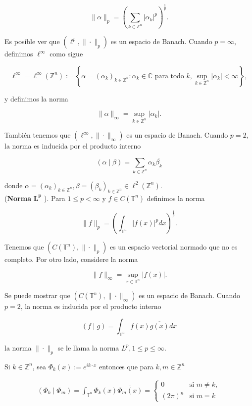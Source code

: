 \documentclass[12pt]{article}
\newcommand\Z{\ensuremath{\mathbb{Z}}}
\newcommand\T{\mathbb{T}}
\begin{document}
$$
\|\alpha\|_p=\left(\sum_{k\in \Z^n}\left|\alpha_k\right|^p\right)^{\frac{1}{p}}.
$$


Es posible ver que $\left(\ell^p,\|\cdot\|_p\right)$ es un espacio de Banach. Cuando $p=\infty$, definimos $\ell^{\infty}$ como sigue

$$
\ell^{\infty}=\ell^{\infty}(\mathbb{Z}^n):=\left\{\alpha=\left(\alpha_k\right)_{k \in \mathbb{Z}^n}: \alpha_k \in \mathbb{C} \text { para todo } k, \sup _{k \in \mathbb{Z}^n}\left|\alpha_k\right|<\infty\right\},
$$

y definimos la norma

$$
\|\alpha\|_{\infty}=\sup _{k \in \mathbb{Z}^n}\left|\alpha_k\right|.
$$


También tenemos que $\left(\ell^{\infty},\|\cdot\|_{\infty}\right)$ es un espacio de Banach.
Cuando $p=2$, la norma es inducida por el producto interno

$$
(\alpha \mid \beta)=\sum_{k\in \Z^n} \alpha_k \overline{\beta_k}
$$

donde $\alpha=\left(\alpha_k\right)_{k \in \mathbb{Z}^n}, \beta=\left(\beta_k\right)_{k \in \mathbb{Z}^n} \in \ell^2(\mathbb{Z}^n)$.\\



(\textbf{Norma} $\mathbf{L^p}$ ). Para $1 \leq p<\infty$ y $f \in C(\T^n)$ definimos la norma

$$
\|f\|_p=\left(\int_{\T^n}|f(x)|^p d x\right)^{\frac{1}{p}}.
$$


Tenemos que $\left(C(\T^n),\|\cdot\|_p\right)$ es un espacio vectorial normado que no es completo.
Por otro lado, considere la norma

$$
\|f\|_{\infty}=\sup _{x \in \T^n}|f(x)| .
$$


Se puede mostrar que $\left(C(\T^n),\|\cdot\|_{\infty}\right)$ es un espacio de Banach.
Cuando $p=2$, la norma es inducida por el producto interno

$$
(f \mid g)=\int_{\T^n} f(x) \overline{g(x)} d x
$$


la norma $\|\cdot\|_p$ se le llama la norma $L^p, 1 \leq p \leq \infty$.


\begin{theorem}\label{ortogonalidad}
Si $k \in \mathbb{Z}^n$, sea $\Phi_k(x):=e^{i k \cdot x}$ entonces que para $k, m \in \mathbb{Z}^n$

$$
\begin{array}{ll}
\displaystyle\left(\Phi_k \mid \Phi_m\right)=\int_{\T^n} \Phi_k(x) \overline{\Phi_m(x)}=\begin{cases}
0 \quad &\text{si }m\neq  k,\\
(2\pi)^n &\text{si } m=k
\end{cases}
\end{array}
$$
\end{theorem}
\end{document}
